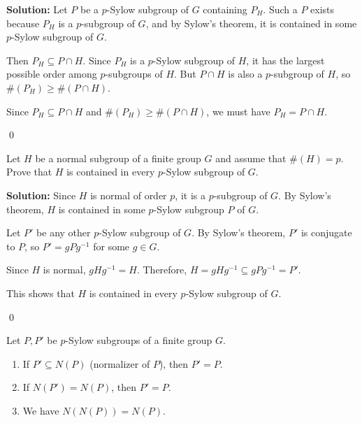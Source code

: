 \noindent\textbf{Solution:} Let $P$ be a $p$-Sylow subgroup of $G$ containing $P_H$. Such a $P$ exists because $P_H$ is a $p$-subgroup of $G$, and by Sylow's theorem, it is contained in some $p$-Sylow subgroup of $G$.

Then $P_H \subseteq P \cap H$. Since $P_H$ is a $p$-Sylow subgroup of $H$, it has the largest possible order among $p$-subgroups of $H$. But $P \cap H$ is also a $p$-subgroup of $H$, so $\#(P_H) \geq \#(P \cap H)$.

Since $P_H \subseteq P \cap H$ and $\#(P_H) \geq \#(P \cap H)$, we must have $P_H = P \cap H$.


\qed
\begin{problembox}
Let $H$ be a normal subgroup of a finite group $G$ and assume that $\#(H) = p$. Prove that $H$ is contained in every $p$-Sylow subgroup of $G$.
\end{problembox}

\noindent\textbf{Solution:} Since $H$ is normal of order $p$, it is a $p$-subgroup of $G$. By Sylow's theorem, $H$ is contained in some $p$-Sylow subgroup $P$ of $G$.

Let $P'$ be any other $p$-Sylow subgroup of $G$. By Sylow's theorem, $P'$ is conjugate to $P$, so $P' = gPg^{-1}$ for some $g \in G$.

Since $H$ is normal, $gHg^{-1} = H$. Therefore, $H = gHg^{-1} \subseteq gPg^{-1} = P'$.

This shows that $H$ is contained in every $p$-Sylow subgroup of $G$.


\qed
\begin{problembox}
Let $P, P'$ be $p$-Sylow subgroups of a finite group $G$.
\begin{enumerate}[label=(\alph*)]
\item If $P' \subseteq N(P)$ (normalizer of $P$), then $P' = P$.
\item If $N(P') = N(P)$, then $P' = P$.
\item We have $N(N(P)) = N(P)$.
\end{enumerate}
\end{problembox}

